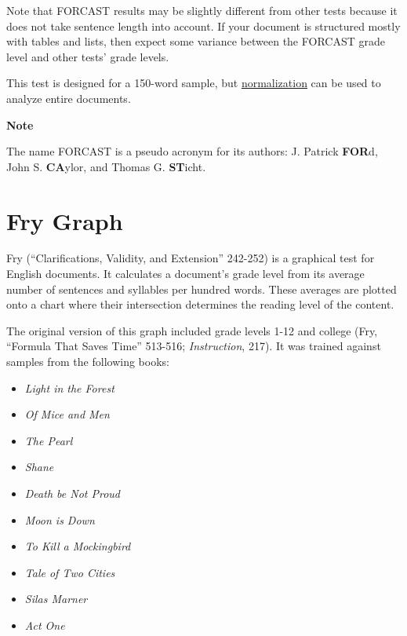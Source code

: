 \documentclass[
]{book}
\providecommand{\tightlist}{%
  \setlength{\itemsep}{0pt}\setlength{\parskip}{0pt}}
\newenvironment{notesection}
    {
    \begin{tcolorbox}[colframe=mediumblue,colback=lightblue,coltext=mediumblue,arc=3mm]
    \faLightbulb[regular] \textbf{Note} \newline
    }
    {
    \end{tcolorbox}
    }
\theoremstyle{definition}
\theoremstyle{definition}
\theoremstyle{definition}
\theoremstyle{definition}
\theoremstyle{remark}
\begin{document}
Note that FORCAST results may be slightly different from other tests because it does not take sentence length into account. If your document is structured mostly with tables and lists, then expect some variance between the FORCAST grade level and other tests' grade levels.

This test is designed for a 150-word sample, but \protect\hyperlink{glossary}{normalization} can be used to analyze entire documents.

\begin{notesection}
The name FORCAST is a pseudo acronym for its authors: J. Patrick \textbf{FOR}d, John S. \textbf{CA}ylor, and Thomas G. \textbf{ST}icht.

\end{notesection}


\newpage

\hypertarget{fry-test}{%
\section{\texorpdfstring{Fry Graph}{Fry Graph}}\label{fry-test}}

Fry (``Clarifications, Validity, and Extension'' 242-252) is a graphical test for English documents. It calculates a document's grade level from its average number of sentences and syllables per hundred words. These averages are plotted onto a chart where their intersection determines the reading level of the content.

The original version of this graph included grade levels 1-12 and college (Fry, ``Formula That Saves Time'' 513-516; \emph{Instruction}, 217). It was trained against samples from the following books:

\begin{itemize}
\tightlist
\item
  \emph{Light in the Forest}
\item
  \emph{Of Mice and Men}
\item
  \emph{The Pearl}
\item
  \emph{Shane}
\item
  \emph{Death be Not Proud}
\item
  \emph{Moon is Down}
\item
  \emph{To Kill a Mockingbird}
\item
  \emph{Tale of Two Cities}
\item
  \emph{Silas Marner}
\item
  \emph{Act One}
\end{itemize}
\end{document}
